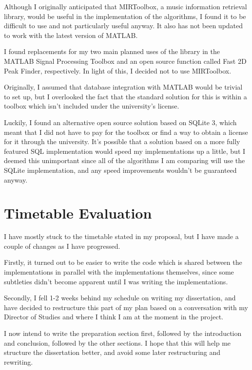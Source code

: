 \documentclass[12pt]{article}
\begin{document}
Although I originally anticipated that MIRToolbox, a music information retrieval library, would be useful in the implementation of the algorithms, I found it to be difficult to use and not particularly useful anyway. It also has not been updated to work with the latest version of MATLAB. 

I found replacements for my two main planned uses of the library in the MATLAB Signal Processing Toolbox and an open source function called Fast 2D Peak Finder, respectively. In light of this, I decided not to use MIRToolbox.

Originally, I assumed that database integration with MATLAB would be trivial to set up, but I overlooked the fact that the standard solution for this is within a toolbox which isn't included under the university's license. 

Luckily, I found an alternative open source solution based on SQLite 3, which meant that I did not have to pay for the toolbox or find a way to obtain a license for it through the university. It's possible that a solution based on a more fully featured SQL implementation would speed my implementations up a little, but I deemed this unimportant since all of the algorithms I am comparing will use the SQLite implementation, and any speed improvements wouldn't be guaranteed anyway.

\section*{Timetable Evaluation}

I have mostly stuck to the timetable stated in my proposal, but I have made a couple of changes as I have progressed.

Firstly, it turned out to be easier to write the code which is shared between the implementations in parallel with the implementations themselves, since some subtleties didn't become apparent until I was writing the implementations. 

Secondly, I fell 1-2 weeks behind my schedule on writing my dissertation, and have decided to restructure this part of my plan based on a conversation with my Director of Studies and where I think I am at the moment in the project.

I now intend to write the preparation section first, followed by the introduction and conclusion, followed by the other sections. I hope that this will help me structure the dissertation better, and avoid some later restructuring and rewriting. 
\end{document}
